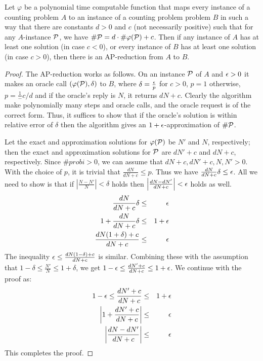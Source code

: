 \begin{lemma}\label{lem:linear}
Let \(\varphi\) be a polynomial time computable function that maps every instance of a
counting problem \(A\) to an instance of a counting problem problem \(B\) in such a way that
there are constants \(d > 0\) and \(c\) (not necessarily positive) such that
for any \(A\)-instance \(\mathcal{P}\), we have
\(\#\mathcal{P} = d\cdot \#\varphi(\mathcal{P}) + c\)\@. Then if any instance of \(A\)
has at least one solution 
(in case \(c < 0\)), or every instance of \(B\) has at least one solution (in case \(c>0\)), then
there is an AP-reduction from \(A\) to \(B\)\@.
\end{lemma}

\begin{proof}
The AP-reduction works as follows. On an instance \(\mathcal{P}\) of \(A\) and \(\epsilon > 0\) it makes 
an oracle call \((\varphi(\mathcal{P}),\delta)\) to \(B\), where \(\delta = \frac{\epsilon}{p}\) for 
\(c > 0\), \(p = 1\) otherwise, \(p = \frac1-c/d\) and
if the oracle's reply is \(N\), it returns \(dN + c\)\@. Clearly the algorithm make polynomially 
many steps and oracle calls, and the oracle request is of the correct form.
Thus, it suffices to show that if the oracle's solution is within relative error of \(\delta\) then
the algorithm gives an \(1+\epsilon\)-approximation of \(\#\mathcal{P}\)\@.

Let the exact and approximation solutions for \(\varphi(\mathcal{P})\) be \(N'\) and \(N\), respectively;
then the exact and approximation solutions for \(\mathcal{P}\) are  
\(dN' + c\) and \(dN + c\), respectively. Since \(\#probi > 0\), we can 
assume that \(dN+c,dN'+c,N,N'>0\)\@. With the choice of \(p\), it is trivial that
 \(\frac{dN}{dN+c} \le p\)\@. Thus we have \(\frac{dN}{dN+c}\delta \le \epsilon\).
All we need to show is that if \(\left|\frac{N-N'}{N}\right|<\delta\) holds then
\(\left|\frac{dN-dN'}{dN+c}\right|<\epsilon\) holds as well.
\begin{eqnarray*}
\frac{dN}{dN+c}\delta & \le & \epsilon \\
1 + \frac{dN}{dN+c}\delta & \le & 1 + \epsilon \\
\frac{d N (1+\delta)+c}{d N + c} & \le & \epsilon \\
\end{eqnarray*}
The inequality \(\epsilon \le \frac{d N (1-\delta)+c}{d N + c}\) is similar.
Combining these with the assumption that \(1-\delta \le \frac{N'}{N} \le 1 + \delta \),
we get \(1-\epsilon \le \frac{dN'+c}{dN+c} \le 1 + \epsilon\). We continue with the proof as:
\begin{eqnarray*}
1-\epsilon \le \frac{dN'+c}{dN+c} & \le & 1 + \epsilon \\
\left|1 + \frac{dN' + c}{dN + c}\right| &\le & \epsilon \\
\left| \frac{dN-dN'}{dN+c}\right| & \le& \epsilon
\end{eqnarray*}
This completes the proof.
\end{proof}

